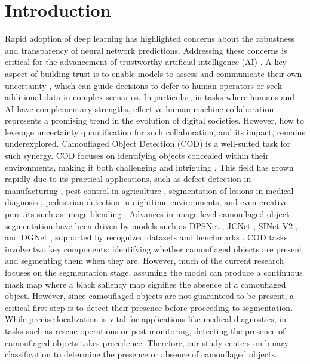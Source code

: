 \documentclass[preprint,12pt,authoryear]{elsarticle}
\begin{document}
\section{Introduction}
\label{sec1}
Rapid adoption of deep learning has highlighted concerns about the robustness and transparency of neural network predictions. Addressing these concerns is critical for the advancement of trustworthy artificial intelligence (AI) \cite{kaur2022trustworthy}. A key aspect of building trust is to enable models to assess and communicate their own uncertainty \cite{10.1145/3675392,gawlikowski2023survey}, which can guide decisions to defer to human operators or seek additional data in complex scenarios. In particular, in tasks where humans and AI have complementary strengths, effective human-machine collaboration represents a promising trend in the evolution of digital societies. However, how to leverage uncertainty quantification for such collaboration, and its impact, remains underexplored.
Camouflaged Object Detection (COD) is a well-suited task for such synergy. COD focuses on identifying objects concealed within their environments, making it both challenging and intriguing \cite{lv2023toward}. This field has grown rapidly due to its practical applications, such as defect detection in manufacturing \cite{xiong2021attention}, pest control in agriculture \cite{rustia2020application}, segmentation of lesions in medical diagnosis \cite{fan2020pranet}, pedestrian detection in nighttime environments\cite{yang2024dual}, and even creative pursuits such as image blending \cite{suo2021neuralhumanfvv}. Advances in image-level camouflaged object segmentation have been driven by models such as DPSNet \cite{li2024dpsnet}, JCNet \cite{jiang2023camouflaged}, SINet-V2 \cite{fan2021concealed}, and DGNet \cite{ji2023deep}, supported by recognized datasets and benchmarks \cite{bi2021rethinking}. COD tasks involve two key components: identifying whether camouflaged objects are present and segmenting them when they are. However, much of the current research focuses on the segmentation stage, assuming the model can produce a continuous mask map where a black saliency map signifies the absence of a camouflaged object. However, since camouflaged objects are not guaranteed to be present, a critical first step is to detect their presence before proceeding to segmentation. While precise localization is vital for applications like medical diagnostics, in tasks such as rescue operations or pest monitoring, detecting the presence of camouflaged objects takes precedence. Therefore, our study centers on binary classification to determine the presence or absence of camouflaged objects.
\end{document}
